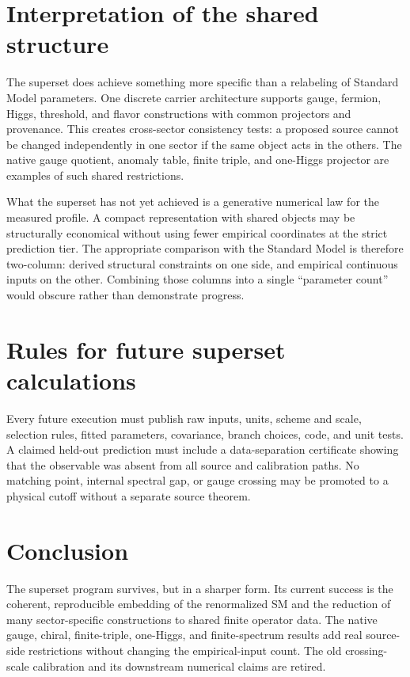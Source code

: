 \documentclass[11pt]{article}
\begin{document}
\section{Interpretation of the shared structure}

The superset does achieve something more specific than a relabeling of
Standard Model parameters. One discrete carrier architecture supports gauge,
fermion, Higgs, threshold, and flavor constructions with common projectors and
provenance. This creates cross-sector consistency tests: a proposed source
cannot be changed independently in one sector if the same object acts in the
others. The native gauge quotient, anomaly table, finite triple, and one-Higgs
projector are examples of such shared restrictions.

What the superset has not yet achieved is a generative numerical law for the
measured profile. A compact representation with shared objects may be
structurally economical without using fewer empirical coordinates at the
strict prediction tier. The appropriate comparison with the Standard Model is
therefore two-column: derived structural constraints on one side, and
empirical continuous inputs on the other. Combining those columns into a
single ``parameter count'' would obscure rather than demonstrate progress.

\section{Rules for future superset calculations}

Every future execution must publish raw inputs, units, scheme and scale,
selection rules, fitted parameters, covariance, branch choices, code, and unit
tests. A claimed held-out prediction must include a data-separation certificate
showing that the observable was absent from all source and calibration paths.
No matching point, internal spectral gap, or gauge crossing may be promoted to
a physical cutoff without a separate source theorem.

\section{Conclusion}

The superset program survives, but in a sharper form. Its current success is
the coherent, reproducible embedding of the renormalized SM and the reduction
of many sector-specific constructions to shared finite operator data. The
native gauge, chiral, finite-triple, one-Higgs, and finite-spectrum results add
real source-side restrictions without changing the empirical-input count. The
old crossing-scale calibration and its downstream numerical claims are
retired.
\end{document}
